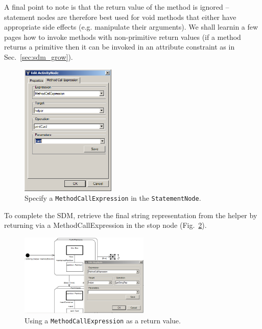 A final point to note is that the
return value of the method is ignored -- statement nodes are therefore best used
for void methods that either have appropriate side effects (e.g. manipulate
their arguments).  We shall learn\clearpage in a few pages how to invoke
methods with non-primitive return values (if a method returns a primitive then it can be
invoked in an attribute constraint as in Sec.~\ref{sec:sdm_grow}).

\begin{figure}[htbp]
\begin{center}
  \includegraphics[width=0.4\textwidth]{pics/sdmBilder/toString/sdm74}
  \caption{Specify a \texttt{MethodCallExpression} in the
  \texttt{StatementNode}.}
  \label{fig:sdm_tostring_3}
\end{center}
\end{figure}

To complete the SDM, retrieve the final string representation from the helper by
returning via a MethodCallExpression in the stop node
(Fig.~\ref{fig:sdm_tostring_4}). 

\begin{figure}[htbp]
\begin{center}
  \includegraphics[width=0.55\textwidth]{pics/sdmBilder/toString/sdm75}
  \caption{Using a \texttt{MethodCallExpression} as a return value.}  
  \label{fig:sdm_tostring_4}
\end{center}
\end{figure}

